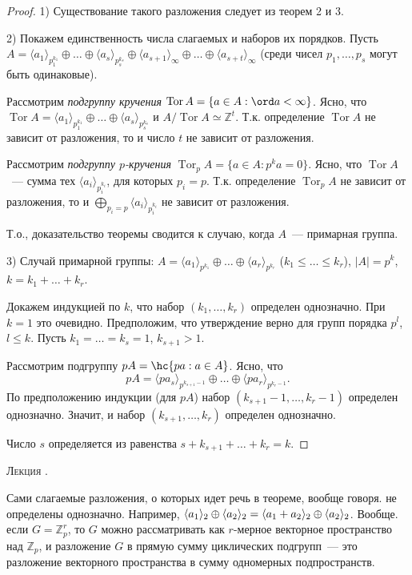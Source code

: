 \documentclass[a4paper]{article}
\newcounter{lec}
\renewcommand{\thelec}{\Roman{lec}}
\newcommand*{\lecture}[1]{\refstepcounter{lec}\vspace{20pt}
\begin{center}{\rmfamily\textsc{Лекция \thelec. \\ \textbf{#1}}}\vspace{5pt}
\end{center}}
\renewcommand{\Tor}{\mathop{\mathrm{Tor}}\nolimits}
\newcommand*{\p}[1]{#1\nobreak\discretionary{}{\hbox{$\mathsurround=0pt #1$}}{}}
\begin{document}
\begin{proof}
1) Существование такого разложения следует из теорем 2 и 3.

2) Покажем единственность числа слагаемых и наборов их порядков.
Пусть $A=\langle a_1\rangle_{p_1^{k_1}}\oplus\ldots\oplus\langle
a_s\rangle_{p_s^{k_s}}\oplus\langle
a_{s+1}\rangle_\infty\oplus\ldots\oplus\langle
a_{s+t}\rangle_\infty$ (среди чисел $p_1,\ldots,p_s$ могут быть
одинаковые).

Рассмотрим \emph{подгруппу кручения} $\Tor A=\{a\in A:\ord
a<\infty\}$. Ясно, что $\Tor A=\langle
a_1\rangle_{p_1^{k_1}}\oplus\ldots\oplus\langle
a_s\rangle_{p_s^{k_s}}$ и $A/\Tor A\simeq\mathbb{Z}^t$. Т.к.
определение $\Tor A$ не зависит от разложения, то и число $t$ не
зависит от разложения.

Рассмотрим \emph{подгруппу $p$-кручения} $\Tor_p A=\{a\in
A:p^ka=0\}$. Ясно, что $\Tor A$~--- сумма тех $\langle
a_i\rangle_{p_i^{k_i}}$, для которых $p_i=p$. Т.к. определение
$\Tor_pA$ не зависит от разложения, то и
$\bigoplus\limits_{p_i=p}\langle a_i\rangle_{p_i^{k_i}}$ не зависит
от разложения.

Т.о., доказательство теоремы сводится к случаю, когда $A$~---
примарная группа.

3) Случай примарной группы: $A=\langle
a_1\rangle_{p^{k_1}}\oplus\ldots\oplus\langle a_r\rangle_{p^{k_r}}$
($k_1\leqslant\ldots\leqslant k_r$), $|A|=p^k$, $k=k_1+\ldots+k_r$.

Докажем индукцией по $k$, что набор $(k_1,\ldots,k_r)$ определен
однозначно. При $k=1$ это очевидно. Предположим, что утверждение
верно для групп порядка $p^l$, $l\leqslant k$. Пусть
$k_1=\ldots=k_s=1$, $k_{s+1}>1$.

Рассмотрим подгруппу $pA=\hc{pa: a\in A}$. Ясно, что
$$pA=\langle
pa_s\rangle_{p^{k_{s+1}-1}}\oplus\ldots\oplus\langle
pa_r\rangle_{p^{k_r-1}}.$$ По предположению индукции (для $pA$)
набор $(k_{s+1}-1,\ldots,k_r-1)$ определен однозначно. Значит, и набор
$(k_{s+1},\ldots,k_r)$ определен однозначно.

Число $s$ определяется из равенства $s+k_{s+1}+\ldots+k_r=k$.
\end{proof}
\lecture{}

\begin{note}
Сами слагаемые разложения, о которых идет речь в теореме, вообще
говоря. не определены однозначно. Например, $\langle
a_1\rangle_2\oplus\langle a_2\rangle_2\p=\langle
a_1+a_2\rangle_2\oplus\langle a_2\rangle_2$. Вообще. если
$G=\mathbb{Z}_p^r$, то $G$ можно рассматривать как $r$-мерное
векторное пространство над $\mathbb{Z}_p$, и разложение $G$ в прямую
сумму циклических подгрупп~--- это разложение векторного
пространства в сумму одномерных подпространств.
\end{note}
\end{document}
